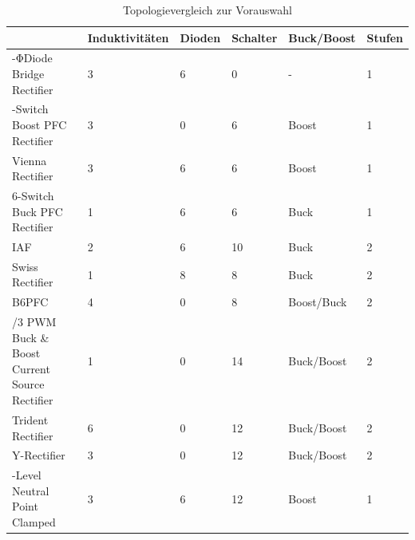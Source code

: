 \begin{table}
	\caption{Topologievergleich zur Vorauswahl}
	\label{tab:vorauswahl}
\begin{tabular}{|>{\centering\arraybackslash}p{3cm}| >{\centering\arraybackslash}m{2cm}|>{\centering\arraybackslash}m{2cm} | >{\centering\arraybackslash}m{2cm}|>{\centering\arraybackslash}m{2cm} |>{\centering\arraybackslash}m{2cm} |}
	\hline
	& Induktivitäten & Dioden & Schalter & Buck/Boost & Stufen \\
	\hline
	3-ΦDiode Bridge Rectifier & \cellcolor{yellow!25}3 &\cellcolor{red!25}6 &\cellcolor{green!25} 0 & \cellcolor{red!25}- & \cellcolor{green!25}1 \\
	\hline
	6-Switch Boost PFC Rectifier & \cellcolor{yellow!25}3 &\cellcolor{green!25} 0 & \cellcolor{green!25}6 & \cellcolor{red!25}Boost & \cellcolor{green!25}1 \\
	\hline
	Vienna Rectifier & \cellcolor{yellow!25}3 &\cellcolor{red!25}6 & \cellcolor{green!25}6 & \cellcolor{red!25}Boost & \cellcolor{green!25}1 \\
	\hline
	\cellcolor{green!10}6-Switch Buck PFC Rectifier & \cellcolor{green!25}1 &\cellcolor{red!25}6 &\cellcolor{green!25} 6 & \cellcolor{green!25}Buck & \cellcolor{green!25}1 \\
	\hline
	\cellcolor{green!10} \gls{IAF} & \cellcolor{green!25} 2 &\cellcolor{red!25}6 & \cellcolor{yellow!25}10 & \cellcolor{green!25}Buck & \cellcolor{red!25}2 \\
	\hline
	\cellcolor{green!10}Swiss Rectifier & \cellcolor{green!25}1 &\cellcolor{red!25}8 &\cellcolor{green!25} 8 & \cellcolor{green!25} Buck & \cellcolor{red!25}2 \\
	\hline
	\cellcolor{green!10} \gls{B6PFC} &\cellcolor{yellow!25}4 & \cellcolor{green!25} 0 &\cellcolor{green!25} 8 &\cellcolor{green!25} Boost/Buck & \cellcolor{red!25}2 \\
	\hline
	2/3 PWM Buck \& Boost Current Source Rectifier & \cellcolor{green!25} 1 & \cellcolor{green!25}0 & \cellcolor{yellow!25}14 & \cellcolor{green!25}Buck/Boost & \cellcolor{red!25}2 \\
	\hline
	Trident Rectifier & \cellcolor{red!25}6 &\cellcolor{green!25}0 & \cellcolor{yellow!25}12 & \cellcolor{green!25}Buck/Boost & \cellcolor{red!25}2 \\
	\hline
	Y-Rectifier & \cellcolor{yellow!25}3 &\cellcolor{green!25}0 & \cellcolor{yellow!25}12 &\cellcolor{green!25} Buck/Boost & \cellcolor{red!25}2 \\
	\hline
	3-Level Neutral Point Clamped & \cellcolor{yellow!25}3 &\cellcolor{red!25}6 & \cellcolor{yellow!25}12 & \cellcolor{red!25}Boost & \cellcolor{green!25}1 \\

\end{tabular}
\end{table}
